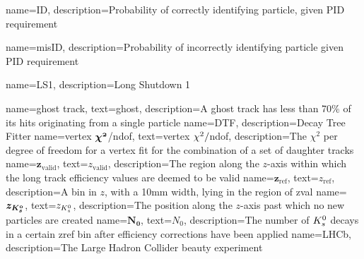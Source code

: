 
                 {
                   name=ID,
                   description={Probability of correctly identifying particle, given PID requirement}
                 }

                 {
                   name=misID,
                   description={Probability of incorrectly identifying particle given PID requirement}
                 }

                 {
                   name=LS1,
                   description={Long Shutdown 1}
                 }


                 {
                   name=ghost track,
                   text=ghost,
                                    description={A ghost track has less than 70\% of its hits originating from a single particle} 
}
                 {
                   name=DTF,
                                                       description={Decay Tree Fitter} 
}
                 {
                   name=vertex $\mathbold{\chisq}$/ndof,
                   text=vertex $\chi^2/$ndof,
                                    description={The $\chi^{2}$ per degree of freedom for a vertex fit for the combination of a set of daughter tracks} 
}
                 {
                   name=$\mathbold{z_{\mathrm{valid}}}$,
                   text=$z_{\mathrm{valid}}$,
                                    description={The region along the $z$-axis within which the long track efficiency values are deemed to be valid} 
}
                 {
                   name=$\mathbold{z_{\mathrm{ref}}}$,
                   text=$z_{\mathrm{ref}}$,
                                    description={A bin in $z$, with a 10mm width, lying in the region of \gls{zval}} 
}
                 {
                   name=$\mathbold{z_{\KS}}$,
                   text=$z_{{{K}^0_{s}}}$,
                                    description={The position along the $z$-axis past which no new \KS particles are created} 
}
                 {
                   name=$\mathbold{N_{0}}$,
                   text=$N_{0}$,
                    description={The number of ${{K}^0_{s}}$ decays in a certain \gls{zref} bin after efficiency corrections have been applied}}
                 {
                   name=LHCb,
                   description={The Large Hadron Collider beauty experiment}
                                    }

